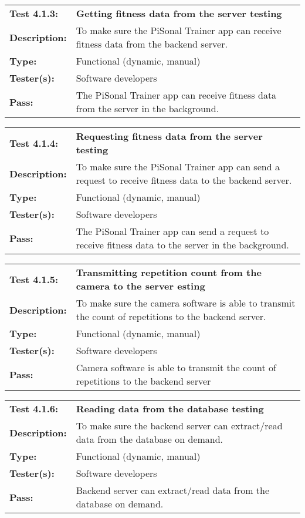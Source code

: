 \documentclass{article}
\newenvironment{testcase}
    {
    \begin{center}
    \begin{mdframed}[
        userdefinedwidth=15.5cm,
        leftmargin=1cm,
        rightmargin=1cm
        ]
    \begin{tabular}{p{2.5cm} p{9cm}}
    }
    {
    \end{tabular}
    \end{mdframed}
    \end{center}
    }
\newcommand{\tctit}[2]{\textbf{#1} & \textbf{#2}}
\newcommand{\tcdesc}{\textbf{Description:}}
\newcommand{\tctype}{\textbf{Type:}}
\newcommand{\testers}{\textbf{Tester(s):}}
\newcommand{\tcpass}{\textbf{Pass:}}
\begin{document}
\begingroup
\begin{testcase}
    \tctit{Test 4.1.3:}{Getting fitness data from the server testing} \\
    \tcdesc & To make sure the PiSonal Trainer app can receive fitness data from the backend server.\\
    \tctype & Functional (dynamic, manual)\\
    \testers & Software developers  \\
    \tcpass & The PiSonal Trainer app can receive fitness data from the server in the background. \\
\end{testcase}
\endgroup
\begingroup
\begin{testcase}
    \tctit{Test 4.1.4:}{Requesting fitness data from the server testing} \\
    \tcdesc & To make sure the PiSonal Trainer app can send a request to receive fitness data to the backend server.\\
    \tctype & Functional (dynamic, manual)\\
    \testers & Software developers \\
    \tcpass & The PiSonal Trainer app can send a request to receive fitness data to the server in the background. \\
\end{testcase}
\endgroup
\begingroup
\begin{testcase}
    \tctit{Test 4.1.5:}{Transmitting repetition count from the camera to the server esting} \\
    \tcdesc & To make sure the camera software is able to transmit the count of repetitions to the backend server.\\
    \tctype & Functional (dynamic, manual)\\
    \testers & Software developers  \\
    \tcpass & Camera software is able to transmit the count of repetitions to the backend server \\
\end{testcase}
\endgroup
\begingroup
\begin{testcase}
    \tctit{Test 4.1.6:}{Reading data from the database testing} \\
    \tcdesc & To make sure the backend server can extract/read data from the database on demand.\\
    \tctype & Functional (dynamic, manual)\\
    \testers & Software developers  \\
    \tcpass & Backend server can extract/read data from the database on demand. \\
\end{testcase}
\end{document}
